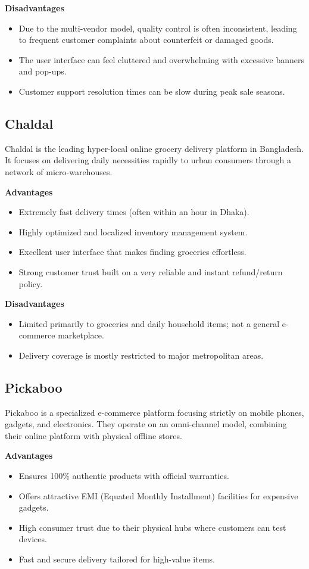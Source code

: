 \textbf{Disadvantages}
\begin{itemize}
    \item Due to the multi-vendor model, quality control is often inconsistent, leading to frequent customer complaints about counterfeit or damaged goods.
    \item The user interface can feel cluttered and overwhelming with excessive banners and pop-ups.
    \item Customer support resolution times can be slow during peak sale seasons.
\end{itemize}

\subsection{Chaldal}
Chaldal is the leading hyper-local online grocery delivery platform in Bangladesh. It focuses on delivering daily necessities rapidly to urban consumers through a network of micro-warehouses.

\textbf{Advantages}
\begin{itemize}
    \item Extremely fast delivery times (often within an hour in Dhaka).
    \item Highly optimized and localized inventory management system.
    \item Excellent user interface that makes finding groceries effortless.
    \item Strong customer trust built on a very reliable and instant refund/return policy.
\end{itemize}

\textbf{Disadvantages}
\begin{itemize}
    \item Limited primarily to groceries and daily household items; not a general e-commerce marketplace.
    \item Delivery coverage is mostly restricted to major metropolitan areas.
\end{itemize}

\subsection{Pickaboo}
Pickaboo is a specialized e-commerce platform focusing strictly on mobile phones, gadgets, and electronics. They operate on an omni-channel model, combining their online platform with physical offline stores.

\textbf{Advantages}
\begin{itemize}
    \item Ensures 100\% authentic products with official warranties.
    \item Offers attractive EMI (Equated Monthly Installment) facilities for expensive gadgets.
    \item High consumer trust due to their physical hubs where customers can test devices.
    \item Fast and secure delivery tailored for high-value items.
\end{itemize}

